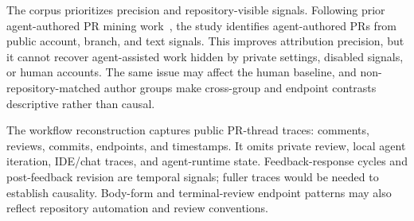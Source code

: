 \documentclass[10pt,conference,anonymous]{IEEEtran}
\begin{document}
The corpus prioritizes precision and repository-visible signals.
Following prior agent-authored PR mining work~\cite{popescu2026autonomous, watanabeUseAgenticCoding2026, watanabeHowAICoding2026}, the study identifies agent-authored PRs from public account, branch, and text signals.
This improves attribution precision, but it cannot recover agent-assisted work hidden by private settings, disabled signals, or human accounts.
The same issue may affect the human baseline, and non-repository-matched author groups make cross-group and endpoint contrasts descriptive rather than causal.

The workflow reconstruction captures public PR-thread traces: comments, reviews, commits, endpoints, and timestamps.
It omits private review, local agent iteration, IDE/chat traces, and agent-runtime state.
Feedback-response cycles and post-feedback revision are temporal signals; fuller traces would be needed to establish causality.
Body-form and terminal-review endpoint patterns may also reflect repository automation and review conventions.
\end{document}
